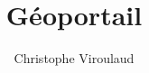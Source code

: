 \documentclass[svgnames,11pt]{beamer}
\author[]{Christophe Viroulaud}
\title{Géoportail}
\date{}
\institute{Seconde - SNT}
\begin{document}
\begin{frame}
\titlepage
\end{frame}
\end{document}
